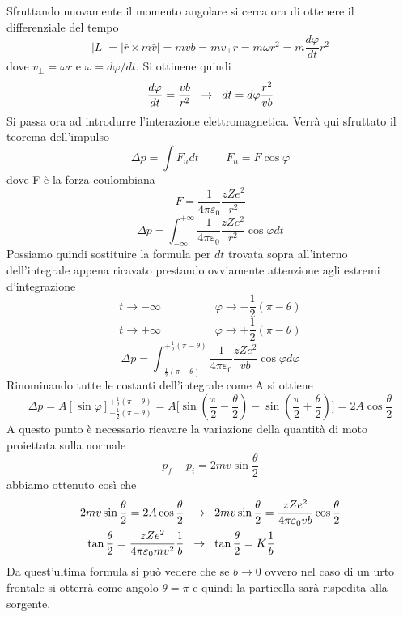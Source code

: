 Sfruttando nuovamente il momento angolare si cerca ora di ottenere il differenziale del tempo
\begin{equation}
|L|=|\bar r \times m\bar v|=mvb=mv_\perp r=m\omega r^2=m\frac{d\varphi}{dt}r^2
\end{equation}
dove $v_\perp=\omega r$ e $\omega=d\varphi/dt$. 
Si ottinene quindi
\[\frac{d\varphi}{dt}=\frac{vb}{r^2}\hspace{0.2cm}\to\hspace{0.2cm} dt=d\varphi \frac{r^2}{vb}\]
Si passa ora ad introdurre l'interazione elettromagnetica. 
Verrà qui sfruttato il teorema dell'impulso
\begin{equation}
\Delta p=\int F_n dt\hspace{1cm}F_n=F\cos\varphi
\end{equation}
dove F è la forza coulombiana
\begin{equation}
F=\frac{1}{4\pi\varepsilon_0}\frac{zZe^2}{r^2}
\end{equation}
\begin{equation}
\Delta p=\int_{-\infty}^{+\infty} \frac{1}{4\pi\varepsilon_0}\frac{zZe^2}{r^2}\cos\varphi dt
\end{equation}
Possiamo quindi sostituire la formula per $dt$ trovata sopra all'interno dell'integrale appena ricavato prestando ovviamente attenzione agli estremi d'integrazione 
\[t\to -\infty\hspace{2cm}\varphi\to-\frac{1}{2}(\pi-\theta)\]
\[t\to +\infty\hspace{2cm}\varphi\to+\frac{1}{2}(\pi-\theta)\]
\begin{equation}
\Delta p=\int _{-\frac{1}{2}(\pi-\theta)}^{+\frac{1}{2}(\pi-\theta)}\frac{1}{4\pi\varepsilon_0}\frac{zZe^2}{vb}\cos\varphi d\varphi
\end{equation}
Rinominando tutte le costanti dell'integrale come A si ottiene
\begin{equation}
\Delta p=A[\sin\varphi] _{-\frac{1}{2}(\pi-\theta)}^{+\frac{1}{2}(\pi-\theta)}=A\biggl[\sin\left(\frac{\pi}{2}-\frac{\theta}{2}\right)-\sin\left(\frac{\pi}{2}+\frac{\theta}{2}\right)\biggl]=2A\cos\frac{\theta}{2}
\end{equation}
A questo punto è necessario ricavare la variazione della quantità di moto proiettata sulla normale
\[p_f-p_i=2mv\sin\frac{\theta}{2}\]
abbiamo ottenuto così che
\begin{equation}
\begin{split}
2mv\sin\frac{\theta}{2}=2A\cos\frac{\theta}{2} \hspace{0.2cm} & \to \hspace{0.2cm} 2mv\sin\frac{\theta}{2}=\frac{zZe^2}{4\pi \varepsilon_0vb}\cos\frac{\theta}{2}\\
\tan\frac{\theta}{2}=\frac{zZe^2}{4\pi\varepsilon_0mv^2}\frac{1}{b} \hspace{0.2cm} & \to\hspace{0.2cm} \tan\frac{\theta}{2}=K\frac{1}{b}
\end{split}
\end{equation}
Da quest'ultima formula si può vedere che se $b\to0$ ovvero nel caso di un urto frontale si otterrà come angolo $\theta=\pi$ e quindi la particella sarà rispedita alla sorgente.

